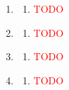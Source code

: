\begin{enumerate}[label=(\roman*)]
        \begin{multicols}{2}
        \begin{enumerate}[label=(\alph*)]
            \item \textcolor{red}{TODO} 
        \end{enumerate}
        \end{multicols}

    \item 

        \begin{multicols}{2}
        \begin{enumerate}[label=(\alph*)]
            \item \textcolor{red}{TODO} 
        \end{enumerate}
        \end{multicols}

    \item 

        \begin{multicols}{2}
        \begin{enumerate}[label=(\alph*)]
            \item \textcolor{red}{TODO} 
        \end{enumerate}
        \end{multicols}

    \item 

        \begin{multicols}{2}
        \begin{enumerate}[label=(\alph*)]
            \item \textcolor{red}{TODO} 
        \end{enumerate}
        \end{multicols}

    \item 

        \begin{multicols}{2}
        \begin{enumerate}[label=(\alph*)]
            \item \textcolor{red}{TODO} 
        \end{enumerate}
        \end{multicols}


\end{enumerate}
